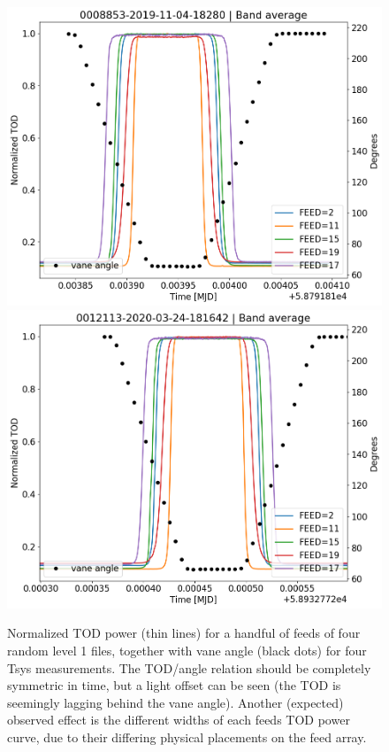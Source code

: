 \documentclass[10pt, a4paper]{article}
\begin{document}
\begin{figure}[H]
    \includegraphics[scale=0.34]{../plots/tod_angle_0008853-2019-11-04-18280.png}
    \includegraphics[scale=0.34]{../plots/tod_angle_0012113-2020-03-24-181642.png}
    \caption{Normalized TOD power (thin lines) for a handful of feeds of four random level 1 files, together with vane angle (black dots) for four Tsys measurements. The TOD/angle relation should be completely symmetric in time, but a light offset can be seen (the TOD is seemingly lagging behind the vane angle). Another (expected) observed effect is the different widths of each feeds TOD power curve, due to their differing physical placements on the feed array.}
    \label{fig:tod_angle}
\end{figure}
\end{document}
